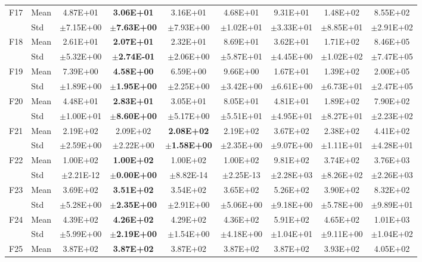 \begin{table}[htbp]
{\begin{tabular}{clccccccc}
F17 & Mean & 4.87E+01 & \textbf{3.06E+01} & 3.16E+01 & 4.68E+01 & 9.31E+01 & 1.48E+02 & 8.55E+02 \\
 & Std & $\pm$7.15E+00 & $\pm$\textbf{7.63E+00} & $\pm$7.93E+00 & $\pm$1.02E+01 & $\pm$3.33E+01 & $\pm$8.85E+01 & $\pm$2.91E+02 \\
F18 & Mean & 2.61E+01 & \textbf{2.07E+01} & 2.32E+01 & 8.69E+01 & 3.62E+01 & 1.71E+02 & 8.46E+05 \\
 & Std & $\pm$5.32E+00 & $\pm$\textbf{2.74E-01} & $\pm$2.06E+00 & $\pm$5.87E+01 & $\pm$4.45E+00 & $\pm$1.02E+02 & $\pm$7.47E+05 \\
F19 & Mean & 7.39E+00 & \textbf{4.58E+00} & 6.59E+00 & 9.66E+00 & 1.67E+01 & 1.39E+02 & 2.00E+05 \\
 & Std & $\pm$1.89E+00 & $\pm$\textbf{1.95E+00} & $\pm$2.25E+00 & $\pm$3.42E+00 & $\pm$6.61E+00 & $\pm$6.73E+01 & $\pm$2.47E+05 \\
F20 & Mean & 4.48E+01 & \textbf{2.83E+01} & 3.05E+01 & 8.05E+01 & 4.81E+01 & 1.89E+02 & 7.90E+02 \\
 & Std & $\pm$1.00E+01 & $\pm$\textbf{8.60E+00} & $\pm$5.17E+00 & $\pm$5.51E+01 & $\pm$4.95E+01 & $\pm$8.27E+01 & $\pm$2.23E+02 \\
F21 & Mean & 2.19E+02 & 2.09E+02 & \textbf{2.08E+02} & 2.19E+02 & 3.67E+02 & 2.38E+02 & 4.41E+02 \\
 & Std & $\pm$2.59E+00 & $\pm$2.22E+00 & $\pm$\textbf{1.58E+00} & $\pm$2.35E+00 & $\pm$9.07E+00 & $\pm$1.11E+01 & $\pm$4.28E+01 \\
F22 & Mean & 1.00E+02 & \textbf{1.00E+02} & 1.00E+02 & 1.00E+02 & 9.81E+02 & 3.74E+02 & 3.76E+03 \\
 & Std & $\pm$2.21E-12 & $\pm$\textbf{0.00E+00} & $\pm$8.82E-14 & $\pm$2.25E-13 & $\pm$2.28E+03 & $\pm$8.26E+02 & $\pm$2.26E+03 \\
F23 & Mean & 3.69E+02 & \textbf{3.51E+02} & 3.54E+02 & 3.65E+02 & 5.26E+02 & 3.90E+02 & 8.32E+02 \\
 & Std & $\pm$5.28E+00 & $\pm$\textbf{2.35E+00} & $\pm$2.91E+00 & $\pm$5.06E+00 & $\pm$9.18E+00 & $\pm$5.78E+00 & $\pm$9.89E+01 \\
F24 & Mean & 4.39E+02 & \textbf{4.26E+02} & 4.29E+02 & 4.36E+02 & 5.91E+02 & 4.65E+02 & 1.01E+03 \\
 & Std & $\pm$5.99E+00 & $\pm$\textbf{2.19E+00} & $\pm$1.54E+00 & $\pm$4.18E+00 & $\pm$1.04E+01 & $\pm$9.11E+00 & $\pm$1.04E+02 \\
F25 & Mean & 3.87E+02 & \textbf{3.87E+02} & 3.87E+02 & 3.87E+02 & 3.87E+02 & 3.93E+02 & 4.05E+02 \\

\end{tabular}}
\end{table}
